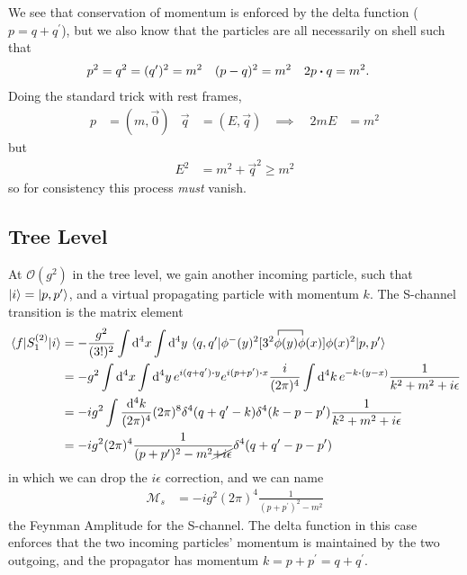 \documentclass[notes.tex]{subfiles}
\begin{document}
We see that conservation of momentum is enforced by the delta function ($p = q + q^\prime$), but we also know that the particles are all necessarily on shell such that
\begin{align*}
	p^2 = q^2 &= (q^\prime)^2 = m^2&
	(p-q)^2 &= m^2&
	2p\vdot q &= m^2.
\end{align*}
Doing the standard trick with rest frames,
\begin{align*}
	p &= (m, \vec{0}) & \vec{q} &= (E, \vec{q}) & \implies \quad 2mE&= m^2
\end{align*}
but
\begin{align*}
	E^2 &= m^2 + \vec{q}^2 \geq m^2
\end{align*}
so for consistency this process \emph{must} vanish.

\subsection{Tree Level}
At $\mathcal{O}(g^2)$ in the tree level, we gain another incoming particle, such that $\ket{i} = \ket{p, p^\prime}$, and a virtual propagating particle with momentum $k$.
The S-channel transition is the matrix element
\begin{align*}
	\mel{f}{S_1^{(2)}}{i} &= -\frac{g^2}{(3!)^2} \int \dd[4]{x} \int \dd[4]{y} \mel{q, q^\prime}{\phi^-(y)^2[3^2\contraction{}{\phi}{(y)}{\phi}\phi(y)\phi(x)]\phi(x)^2}{p, p^\prime}\\
	&= -g^2 \int \dd[4]{x} \int \dd[4]{y} e^{i(q+q^\prime)\vdot{y}}e^{i(p+p^\prime)\vdot{x}} \frac{i}{(2\pi)^4}\int\dd[4]{k} e^{-k\vdot(y-x)}\frac{1}{k^2 + m^2 + i\epsilon}\\
	&= -ig^2\int \frac{\dd[4]{k}}{(2\pi)^4} (2\pi)^8 \delta^4(q + q^\prime - k) \delta^4(k-p-p^\prime)\frac{1}{k^2 + m^2 + i\epsilon}\\
	&= -ig^2 (2\pi)^4 \frac{1}{(p+p^\prime)^2 - m^2 \cancel{+i\epsilon}} \delta^4(q+q^\prime - p - p^\prime)
\end{align*}
in which we can drop the $i\epsilon$ correction, and we can name
\begin{align*}
	\mathcal{M}_s &= -ig^2 (2\pi)^4 \frac{1}{(p+p^\prime)^2 - m^2}
\end{align*}
the Feynman Amplitude for the S-channel.
The delta function in this case enforces that the two incoming particles' momentum is maintained by the two outgoing, and the propagator has momentum $k = p+ p^\prime = q + q^\prime$.
\end{document}
